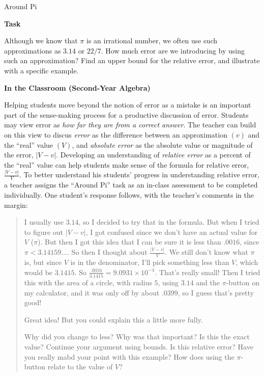 \TriExample
  {Around Pi}
  {
    \textbf{Task}

    Although we know that $\pi$ is an irrational number, we often use such approximations as $3.14$ or $22/7$. How much error are we introducing by using such an approximation? Find an upper bound for the relative error, and illustrate with a specific example.

    \textbf{In the Classroom (Second-Year Algebra)}

    Helping students move beyond the notion of error as a mistake is an important part of the sense-making process for a productive discussion of error. Students may view error as \emph{how far they are from a correct answer}. The teacher can build on this view to discus \emph{error} as the difference between an approximation $(v)$ and the ``real'' value $(V)$, and \emph{absolute error} as the absolute value or magnitude of the error, $\lvert V - v\rvert$. Developing an understanding of \emph{relative error} as a percent of the ``real'' value can help students make sense of the formula for relative error, $\frac{\lvert V-v\rvert}{V}$. To better understand his students' progress in understanding relative error, a teacher assigns the ``Around Pi'' task as an in-class assessment to be completed individually. One student's response follows, with the teacher's comments in the margin:\vspace{.5\baselineskip}

    \begin{quotation}
      I usually use $3.14$, so I decided to try that in the formula. But when I tried to figure out $\lvert V-v\rvert$, I got confused since we don't have an actual value for $V$ ($\pi$). But then I got this idea that I can be sure it is less than $.0016$, since $\pi<3.14159\dots$. So then I thought about $\frac{\lvert V-v\rvert}{V}$. We still don't know what $\pi$ is, but since $V$ is in the denominator, I'll pick something less than $V$, which would be $3.1415$. So $\frac{.0016}{3.1415}=9.0931\times 10^{-4}$. That's really small! Then I tried this with the area of a circle, with radius $5$, using $3.14$ and the $\pi$-button on my calculator, and it was only off by about $.0399$, so I guess that's pretty good!

      \begin{scriptlist}
        \item[Teacher:] Great idea! But you could explain this a little more fully.\vspace{\baselineskip}

        \item[Teacher:] Why did you change to less? Why was that important? Is this the exact value? Continue your argument using bounds. Is this relative error? Have you really mabd your point with this example? How does using the $\pi$-button relate to the value of $V$?
      \end{scriptlist}
      \end{quotation}\vspace{5.5\baselineskip}

}
